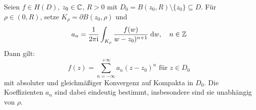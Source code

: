\documentclass[a4paper,twoside,DIV15,BCOR12mm]{scrbook}
\begin{document}
\begin{thm}[Laurent]\label{thm3.6}
Seien $f\in H(D)$, $z_0\in\mathbb{C}$, $R>0$ mit $D_0=B(z_0,R)\setminus\{z_0\}\subseteq D$. Für $\rho\in(0,R)$, setze
$K_\rho=\partial B(z_0,\rho)$ und
\begin{equation}\label{3.1}
a_n=\frac{1}{2\pi\mathrm{i}}\int_{K_\rho}^{}{\frac{f(w)}{w-z_0)^{n+1}}}\;\mathrm{d} w,\quad n\in\mathbb{Z}
\end{equation}
Dann gilt:
\begin{equation}\label{3.2}
f(z)=\sum_{n=-\infty}^{+\infty}a_n(z-z_0)^n\text{ für }z\in D_0
\end{equation}
mit absoluter und gleichmäßiger Konvergenz auf Kompakta in $D_0$. Die Koeffizienten $a_n$ sind dabei eindeutig bestimmt, insbesondere sind sie unabhängig von $\rho$.
\end{thm}
\end{document}
